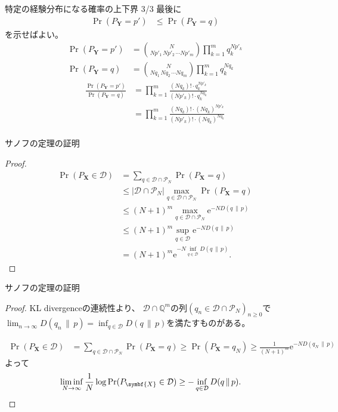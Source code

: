 \documentclass[lualatex,handout]{beamer}
\newcommand\KL[2]{D(#1\,\|\,#2)}
\theoremstyle{definition}
\begin{document}
\begin{frame}{特定の経験分布になる確率の上下界 3/3}
\small
最後に
\begin{align*}
\Pr\left(P_{\symbf{Y}}= p'\right)&\le
\Pr\left(P_{\symbf{Y}}= q\right)
\end{align*}
を示せばよい。
\begin{align*}
\Pr(P_{\symbf{Y}}= p') &= \binom{N}{Np'_1\,Np'_2\,\dotsm Np'_m} \prod_{k=1}^m q_k^{Np'_k}\\
\Pr(P_{\symbf{Y}}= q) &= \binom{N}{Nq_1\,Nq_2\,\dotsm Nq_m} \prod_{k=1}^m q_k^{Nq_k}
\end{align*}
\begin{align*}
\frac{\Pr(P_{\symbf{Y}}= p')}{\Pr(P_{\symbf{Y}}= q)}&=\prod_{k=1}^m\frac{(Nq_k)!\cdot q_k^{Np'_k}}{(Np'_k)!\cdot q_k^{Nq_k}}\\
&=\prod_{k=1}^m\frac{(Nq_k)!\cdot (Nq_k)^{Np'_k}}{(Np'_k)!\cdot (Nq_k)^{Nq_k}}\\
\end{align*}
\end{frame}

\begin{frame}{サノフの定理の証明}
\footnotesize
\sanov
\begin{proof}
\vspace{-2em}
\begin{align*}
\Pr(P_{\symbf{X}}\in\mathcal{D}) &= \sum_{q\in\mathcal{D}\cap\mathcal{P}_N} \Pr(P_{\symbf{X}} = q)\\
 &\le |\mathcal{D}\cap\mathcal{P}_N| \max_{q\in\mathcal{D}\cap\mathcal{P}_N}\Pr(P_{\symbf{X}} = q)\\
 &\le (N+1)^m \max_{q\in\mathcal{D}\cap\mathcal{P}_N}\mathrm{e}^{-N\KL{q}{p}}\\
 &\le (N+1)^m \sup_{q\in\mathcal{D}}\mathrm{e}^{-N\KL{q}{p}}\\
 &= (N+1)^m \mathrm{e}^{-N\inf_{q\in\mathcal{D}}\KL{q}{p}}.
\end{align*}
\end{proof}
\end{frame}


\begin{frame}{サノフの定理の証明}
\footnotesize
\sanov
\begin{proof}
KL divergenceの連続性より、
$\mathcal{D}\cap\mathbb{Q}^m$の列$(q_n\in\mathcal{D}\cap\mathcal{P}_N)_{n\ge 0}$で
$\lim_{n\to\infty} \KL{q_n}{p} = \inf_{q\in\mathcal{D}} \KL{q}{p}$を満たすものがある。

\begin{align*}
\Pr(P_{\symbf{X}}\in\mathcal{D}) &= \sum_{q\in\mathcal{D}\cap\mathcal{P}_N} \Pr(P_{\symbf{X}} = q)
 \ge \Pr(P_{\symbf{X}}=q_N)
 \ge \frac1{(N+1)^m}\mathrm{e}^{-N\KL{q_N}{p}}
\end{align*}
よって
\begin{align*}
\liminf_{N\to\infty}\frac1N
\log\Pr(P_{\symbf{X}}\in\mathcal{D}) &\ge -\inf_{q\in\mathcal{D}}\KL{q}{p}.\qedhere
\end{align*}
\end{proof}
\end{frame}
\end{document}
